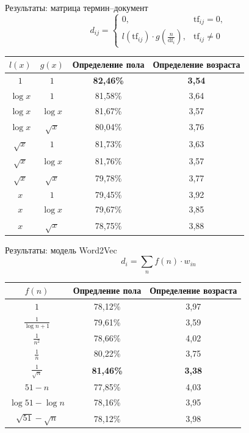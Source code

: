 \documentclass{beamer}
\begin{document}
\begin{frame}{Результаты: матрица термин--документ}
    \[d_{ij} = \begin{cases}
              0,& \mathrm{tf}_{ij} = 0,\\
              l(\mathrm{tf}_{ij}) \cdot g(\frac{n}{\mathrm{df}_{i}}),& \mathrm{tf}_{ij} \ne 0
        \end{cases}\]
    \begin{table}[h!]
    \centering
    \begin{tabular}{|c|c|c|c|}
    \hline
    \boldmath$l(x)$ & \boldmath$g(x)$ & \textbf{Определение пола} & \textbf{Определение возраста} \tabularnewline
    \hline
    $1$ & $1$ & \textbf{82,46\%} & \textbf{3,54} \tabularnewline
    \hline
    $\log{x}$ & $1$ & 81,58\% & 3,64 \tabularnewline
    \hline
    $\log{x}$ & $\log{x}$ & 81,67\% & 3,57 \tabularnewline
    \hline
    $\log{x}$ & $\sqrt{x}$ & 80,04\% & 3,76 \tabularnewline
    \hline
    $\sqrt{x}$ & $1$ & 81,73\% & 3,63 \tabularnewline
    \hline
    $\sqrt{x}$ & $\log{x}$ & 81,76\% & 3,57 \tabularnewline
    \hline
    $\sqrt{x}$ & $\sqrt{x}$ & 79,78\% & 3,77 \tabularnewline
    \hline
    $x$ & $1$ & 79,45\% & 3,92 \tabularnewline
    \hline
    $x$ & $\log{x}$ & 79,67\% & 3,85 \tabularnewline
    \hline
    $x$ & $\sqrt{x}$ & 78,75\% & 3,88 \tabularnewline
    \hline
    \end{tabular}
    \label{tab:tfidf_results}
    \end{table}
\end{frame}

\begin{frame}{Результаты: модель Word2Vec}
    \[d_{i} = \sum_{n}{f(n) \cdot w_{in}}\]
    \begin{table}[h!]
    \centering
    \begin{tabular}{|c|c|c|}
    \hline
    \boldmath$f(n)$ & \textbf{Опредление пола} & \textbf{Определение возраста} \tabularnewline
    \hline
    $1$ & 78,12\% & 3,97 \tabularnewline
    \hline
    $\frac{1}{\log{n + 1}}$ & 79,61\% & 3,59 \tabularnewline
    \hline
    $\frac{1}{n^2}$ & 78,66\% & 4,02 \tabularnewline
    \hline
    $\frac{1}{n}$ & 80,22\% & 3,75 \tabularnewline
    \hline
    $\frac{1}{\sqrt{n}}$ & \textbf{81,46\%} & \textbf{3,38} \tabularnewline
    \hline
    $51 - n$ & 77,85\% & 4,03 \tabularnewline
    \hline
    $\log{51} - \log{n}$ & 78,16\% & 3,95 \tabularnewline
    \hline
    $\sqrt{51} - \sqrt{n}$ & 78,12\% & 3,98 \tabularnewline
    \hline
    \end{tabular}
    \label{tab:doc2vec_results}
    \end{table}
\end{frame}
\end{document}
